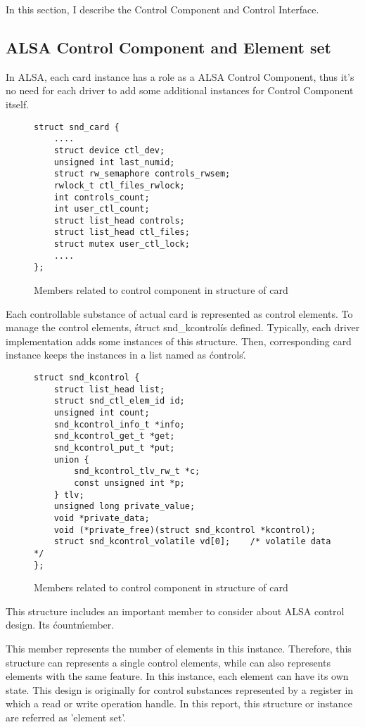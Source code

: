 \documentclass[onecolumn]{article}
\begin{document}
In this section, I describe the Control Component and Control Interface.

\subsection{ALSA Control Component and Element set}

In ALSA, each card instance has a role as a ALSA Control Component, thus it's no need for each driver to add some additional instances for Control Component itself.

\begin{figure}[htbp]
\small
\begin{verbatim}
struct snd_card {
    ....
    struct device ctl_dev;
    unsigned int last_numid;
    struct rw_semaphore controls_rwsem;
    rwlock_t ctl_files_rwlock;
    int controls_count;
    int user_ctl_count;
    struct list_head controls;
    struct list_head ctl_files;
    struct mutex user_ctl_lock;
    ....
};
\end{verbatim}
\caption{{Members related to control component in structure of card}}
\label{alsa-card-structure}
\end{figure}

Each controllable substance of actual card is represented as control elements. To manage the control elements, \'struct snd\_kcontrol\' is defined. Typically, each driver implementation adds some instances of this structure. Then, corresponding card instance keeps the instances in a list named as \'controls\'.

\begin{figure}[htbp]
\small
\begin{verbatim}
struct snd_kcontrol {
    struct list_head list;
    struct snd_ctl_elem_id id;
    unsigned int count;
    snd_kcontrol_info_t *info;
    snd_kcontrol_get_t *get;
    snd_kcontrol_put_t *put;
    union {
        snd_kcontrol_tlv_rw_t *c;
        const unsigned int *p;
    } tlv;
    unsigned long private_value;
    void *private_data;
    void (*private_free)(struct snd_kcontrol *kcontrol);
    struct snd_kcontrol_volatile vd[0];    /* volatile data */
};
\end{verbatim}
\caption{{Members related to control component in structure of card}}
\label{alsa-card-structure}
\end{figure}

This structure includes an important member to consider about ALSA control design. Its \'count\'member.

This member represents the number of elements in this instance. Therefore, this structure can represents a single control elements, while can also represents elements with the same feature. In this instance, each element can have its own state. This design is originally for control substances represented by a register in which a read or write operation handle. In this report, this structure or instance are referred as 'element set'.
\end{document}
